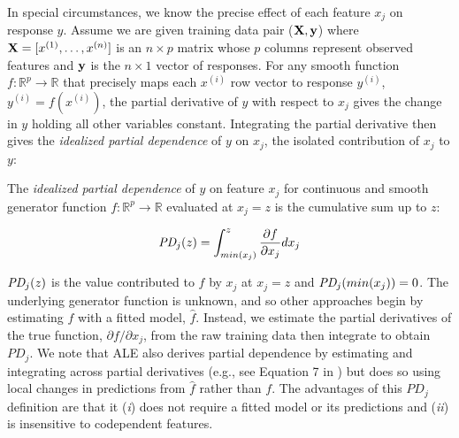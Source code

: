 \documentclass[]{article} %
\renewcommand{\xi}{x^{(i)}}
\begin{document}
In special circumstances, we know the precise effect of each feature $x_j$ on response $y$.  Assume we are given training data pair ($\bf X, y$) where ${\bf X} = [x^{(1)}, \ldots, x^{(n)}]$ is an $n \times p$ matrix whose $p$ columns represent observed features and ${\bf y}$ is the $n \times 1$ vector of responses. For any smooth function $f:\mathbb{R}^{p} \rightarrow \mathbb{R}$ that precisely maps each $\xi$ row vector to response $y^{(i)}$, ${y^{(i)}} = f(\xi)$, the partial derivative of $y$ with respect to $x_j$ gives the change in $y$ holding all other variables constant.  Integrating the partial derivative then gives the {\em idealized partial dependence}  of $y$ on $x_j$, the isolated contribution of $x_j$ to $y$:

 The {\em idealized partial dependence} of $y$ on feature $x_j$ for continuous and smooth generator function $f:\mathbb{R}^{p} \rightarrow \mathbb{R}$ evaluated at $x_j = z$ is the cumulative sum up to $z$:\vspace{-1mm}

\begin{equation}\label{eq:pd}
\text{\it PD}_j(z) = \int_{min(x_j)}^z \frac{\partial f}{\partial x_j} dx_j
\end{equation}\vspace{-1mm}

\noindent $\text{\it PD}_j(z)$ is the value contributed to $f$ by $x_j$ at $x_j = z$ and $\text{\it PD}_j(min(x_j))=0$. The underlying generator function is unknown, and so other approaches begin by estimating $f$ with a fitted model, $\hat{f}$. Instead, we estimate the partial derivatives of the true function, ${\partial f}/{\partial x_j}$, from the raw training data then integrate to obtain $PD_j$. We note that ALE also derives partial dependence by estimating and integrating across partial derivatives (e.g., see Equation 7 in \citealt{ALE}) but does so using local changes in predictions from $\hat{f}$ rather than $f$.  The advantages of this $PD_j$ definition are that it ({\em i}) does not require a fitted model or its predictions and ({\em ii}) is insensitive to codependent features.  
\end{document}
